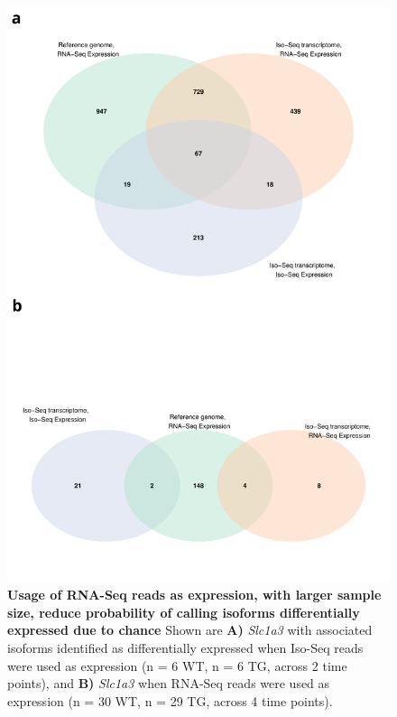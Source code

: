 \begin{figure}[!htp]
	\centering
	\includegraphics[page=17,trim={0cm 20cm 0cm 0cm},clip,scale = 0.55]{Figures/WholeDifferentialAnalysis.pdf}
	\captionsetup{width=0.95\textwidth}
	\caption[Differential Isoform Expression observed in isoforms with high expression but large variance]%
	{\textbf{Usage of RNA-Seq reads as expression, with larger sample size, reduce probability of calling isoforms differentially expressed due to chance} Shown are \textbf{A)} \textit{Slc1a3} with associated isoforms identified as differentially expressed when Iso-Seq reads were used as expression (n = 6 WT, n = 6 TG, across 2 time points), and \textbf{B)} \textit{Slc1a3} when RNA-Seq reads were used as expression (n = 30 WT, n = 29 TG, across 4 time points). 
	\\
}
\end{figure}
